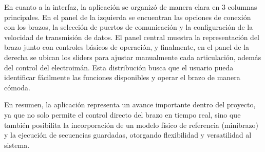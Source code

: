 En cuanto a la interfaz, la aplicación se organizó de manera clara en 3 columnas principales. En el panel de la izquierda se encuentran las opciones de conexión con los brazos, la selección de puertos de comunicación y la configuración de la velocidad de transmisión de datos. El panel central muestra la representación del brazo junto con controles básicos de operación, y finalmente, en el panel de la derecha se ubican los sliders para ajustar manualmente cada articulación, además del control del electroimán. Esta distribución busca que el usuario pueda identificar fácilmente las funciones disponibles y operar el brazo de manera cómoda.

En resumen, la aplicación representa un avance importante dentro del proyecto, ya que no solo permite el control directo del brazo en tiempo real, sino que también posibilita la incorporación de un modelo físico de referencia (minibrazo) y la ejecución de secuencias guardadas, otorgando flexibilidad y versatilidad al sistema.

